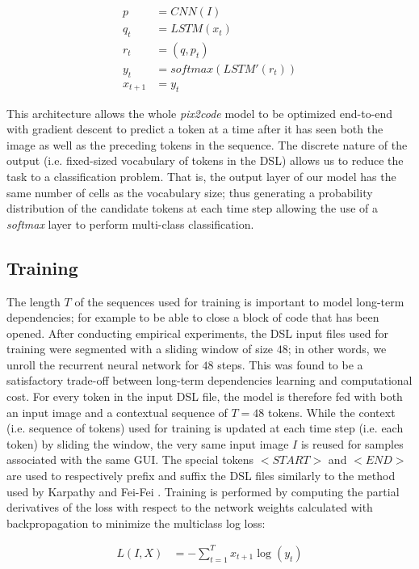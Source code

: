 \documentclass{article}
\begin{document}
\begin{align}
p &= CNN(I)\\
q_t &= LSTM(x_t)\\
r_t &= (q, p_t)\\
y_t &= softmax(LSTM'(r_t))\\
x_{t+1} &= y_t 
\end{align}

This architecture allows the whole \emph{pix2code} model to be optimized end-to-end with gradient descent to predict a token at a time after it has seen both the image as well as the preceding tokens in the sequence.
The discrete nature of the output (i.e. fixed-sized vocabulary of tokens in the DSL) allows us to reduce the task to a classification problem. That is, the output layer of our model has the same number of cells as the vocabulary size; thus generating a probability distribution of the candidate tokens at each time step allowing the use of a \emph{softmax} layer to perform multi-class classification.

\subsection{Training}

The length $T$ of the sequences used for training is important to model long-term dependencies; for example to be able to close a block of code that has been opened. After conducting empirical experiments, the DSL input files used for training were segmented with a sliding window of size $48$; in other words, we unroll the recurrent neural network for $48$ steps. This was found to be a satisfactory trade-off between long-term dependencies learning and computational cost. For every token in the input DSL file, the model is therefore fed with both an input image and a contextual sequence of $T=48$ tokens. While the context (i.e. sequence of tokens) used for training is updated at each time step (i.e. each token) by sliding the window, the very same input image $I$ is reused for samples associated with the same GUI. The special tokens $<START>$ and $<END>$ are used to respectively prefix and suffix the DSL files similarly to the method used by Karpathy and Fei-Fei \cite{karpathy2015deep}. Training is performed by computing the partial derivatives of the loss with respect to the network weights calculated with backpropagation to minimize the multiclass log loss:

\begin{align}
L(I, X) &= - \sum^{T}_{t=1} x_{t+1} \log (y_{t})
\end{align}
\end{document}
